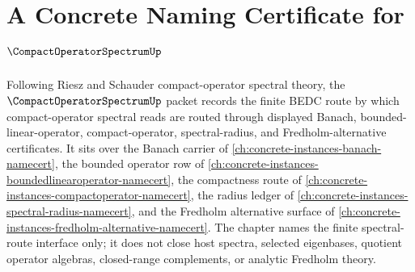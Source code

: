 \chapter{A Concrete Naming Certificate for $\CompactOperatorSpectrumUp$}
\label{ch:concrete-instances-compact-operator-spectrum-namecert}

Following Riesz and Schauder compact-operator spectral theory, the $\CompactOperatorSpectrumUp$ packet records the finite BEDC route by which compact-operator spectral reads are routed through displayed Banach, bounded-linear-operator, compact-operator, spectral-radius, and Fredholm-alternative certificates. It sits over the Banach carrier of \autoref{ch:concrete-instances-banach-namecert}, the bounded operator row of \autoref{ch:concrete-instances-boundedlinearoperator-namecert}, the compactness route of \autoref{ch:concrete-instances-compactoperator-namecert}, the radius ledger of \autoref{ch:concrete-instances-spectral-radius-namecert}, and the Fredholm alternative surface of \autoref{ch:concrete-instances-fredholm-alternative-namecert}. The chapter names the finite spectral-route interface only; it does not close host spectra, selected eigenbases, quotient operator algebras, closed-range complements, or analytic Fredholm theory.

